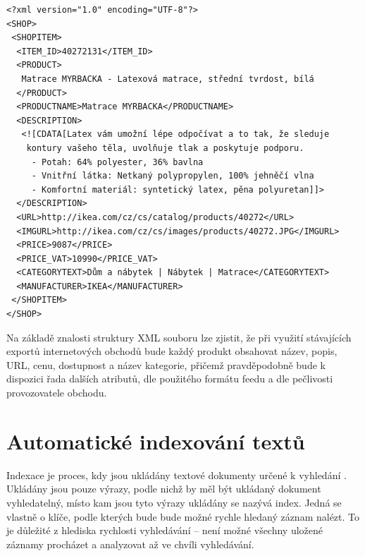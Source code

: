 \documentclass[FM,DP]{tulthesis}
\newenvironment{code}
    {\filbreak\captionsetup{type=listing}}{\filbreak}
\begin{document}
\begin{code}
\captionsetup{singlelinecheck=false,justification=raggedright}
\label{code:xml-heureka}
\begin{verbatim}
<?xml version="1.0" encoding="UTF-8"?>
<SHOP>
 <SHOPITEM>
  <ITEM_ID>40272131</ITEM_ID>
  <PRODUCT>
   Matrace MYRBACKA - Latexová matrace, střední tvrdost, bílá
  </PRODUCT>
  <PRODUCTNAME>Matrace MYRBACKA</PRODUCTNAME>
  <DESCRIPTION>
   <![CDATA[Latex vám umožní lépe odpočívat a to tak, že sleduje
    kontury vašeho těla, uvolňuje tlak a poskytuje podporu.
     - Potah: 64% polyester, 36% bavlna
     - Vnitřní látka: Netkaný polypropylen, 100% jehněčí vlna
     - Komfortní materiál: syntetický latex, pěna polyuretan]]>
  </DESCRIPTION>
  <URL>http://ikea.com/cz/cs/catalog/products/40272</URL>
  <IMGURL>http://ikea.com/cz/cs/images/products/40272.JPG</IMGURL>
  <PRICE>9087</PRICE>
  <PRICE_VAT>10990</PRICE_VAT>
  <CATEGORYTEXT>Dům a nábytek | Nábytek | Matrace</CATEGORYTEXT>
  <MANUFACTURER>IKEA</MANUFACTURER>
 </SHOPITEM>
</SHOP>
\end{verbatim}
\end{code}

Na základě znalosti struktury XML souboru lze zjistit, že při využití stávajících exportů
internetových obchodů bude každý produkt obsahovat název, popis, URL, cenu, dostupnost
a název kategorie, přičemž pravděpodobně bude k dispozici řada dalších atributů, 
dle použitého formátu feedu a dle pečlivosti provozovatele obchodu.

\section{Automatické indexování textů} \label{ch:indexace}

Indexace je proces, kdy jsou ukládány textové dokumenty určené k vyhledání \cite[strana~15]{strossa}.
Ukládány jsou pouze výrazy, podle nichž by měl být ukládaný dokument vyhledatelný, 
místo kam jsou tyto výrazy ukládány se nazývá index. Jedná se vlastně o klíče, 
podle kterých bude bude možné rychle hledaný záznam nalézt. To je důležité z hlediska
rychlosti vyhledávání -- není možné všechny uložené záznamy procházet a analyzovat
až ve chvíli vyhledávání. 
\end{document}

